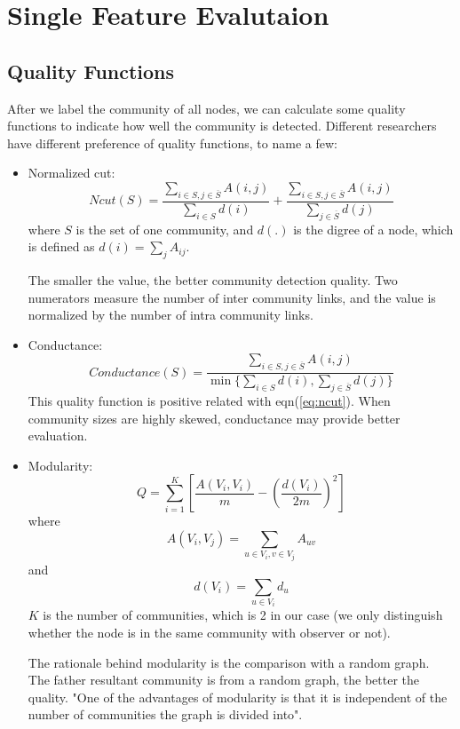 \documentclass[11pt,a4paper]{article}
\begin{document}
\section{Single Feature Evalutaion}

\subsection{Quality Functions}

After we label the community of all nodes, we can calculate some quality 
functions to indicate how well the community is detected. Different researchers
have different preference of quality functions, to name a few:
	\begin{itemize}
		\item Normalized cut:
		\begin{equation}
			Ncut(S)=\frac{\sum_{i \in S, j \in \overline{S}}{A(i,j)}}
			{\sum_{i \in S}{d(i)}}
			+ \frac{\sum_{i \in S, j \in \overline{S}}{A(i,j)}}
			{\sum_{j \in \overline{S}}{d(j)}}					
			\label{eq:ncut}	
		\end{equation}
		where $S$ is the set of one community, 
		and $d(.)$ is the digree of a node, which is defined as 
		$d(i)=\sum_j{A_{ij}}$.
		
		The smaller the value, the better community detection quality. 
		Two numerators measure the number of inter community links, 
		and the value is normalized by the number of intra community links. 
		\item Conductance:
		\begin{equation}
			Conductance(S)=\frac{\sum_{i \in S, j \in \overline{S}}{A(i,j)}}
			{\min \{ \sum_{i \in S}{d(i)}, \sum_{j \in \overline{S}}{d(j)}\}}	
			\label{eq:conductance}			
		\end{equation}
		This quality function is positive related with eqn(\ref{eq:ncut}). 
		When community sizes are highly skewed, conductance may provide 
		better evaluation. 
		\item Modularity:
		\begin{equation}
			Q=\sum_{i=1}^{K}{\left[ 
			\frac{A(V_i,V_i)}{m} 
			-\left( \frac{d(V_i)}{2m}\right)^2
			\right]}
			\label{eq:modularity}
		\end{equation}
		where 
		\begin{equation}
			A(V_i,V_j)= \sum_{u \in V_i,v \in V_j}{A_{uv}}
		\end{equation}
		and 
		\begin{equation}
			d(V_i)=\sum_{u \in V_i}{d_u}
		\end{equation}
		$K$ is the number of communities, which is 2 in our case
		(we only distinguish whether the node is in the same community
		with observer or not).
		
		The rationale behind modularity is the comparison with a random 
		graph. The father resultant community is from a random graph, 
		the better the quality. "One of the advantages of modularity is 
		that it is independent of the number of communities the graph is
		divided into"\cite{aggarwal2011social}. 
	\end{itemize}
	
\end{document}
